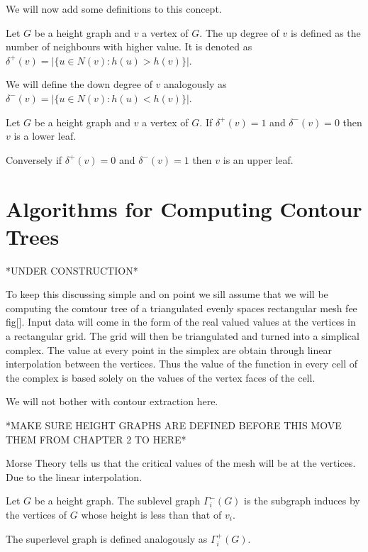 We will now add some definitions to this concept.

\begin{defn} Let $G$ be a height graph and $v$ a vertex of $G$. The up degree of $v$ is defined as the number of neighbours with higher value. It is denoted as $\delta^+(v) = \big|\{ u \in N(v) : h(u) > h(v) \}\big|$.   \end{defn}

We will define the down degree of $v$ analogously as $\delta^-(v) = \big|\{ u \in N(v) : h(u) < h(v) \}\big|$.

\begin{defn} Let $G$ be a height graph and $v$ a vertex of $G$. If  $\delta^+(v) = 1$ and $\delta^-(v) = 0$ then $v$ is a lower leaf.  \end{defn}

Conversely if $\delta^+(v) = 0$ and $\delta^-(v) = 1$ then $v$ is an upper leaf.

\section{Algorithms for Computing Contour Trees}

*UNDER CONSTRUCTION*

To keep this discussing simple and on point we sill assume that we will be computing the comtour tree of a triangulated evenly spaces rectangular mesh fee fig[]. Input data will come in the form of the real valued values at the vertices in a rectangular grid. The grid will then be triangulated and turned into a simplical complex. The value at every point in the simplex are obtain through linear interpolation between the vertices. Thus the value of the function in every cell of the complex is based solely on the values of the vertex faces of the cell.

We will not bother with contour extraction here.

*MAKE SURE HEIGHT GRAPHS ARE DEFINED BEFORE THIS MOVE THEM FROM CHAPTER 2 TO HERE*

Morse Theory tells us that the critical values of the mesh will be at the vertices. Due to the linear interpolation.

\begin{defn} Let $G$ be a height graph. The sublevel graph $\Gamma_i^-(G)$ is the subgraph induces by the vertices of $G$ whose height is less than that of $v_i$.  \end{defn}

The superlevel graph is defined analogously as $\Gamma_i^+(G)$.

